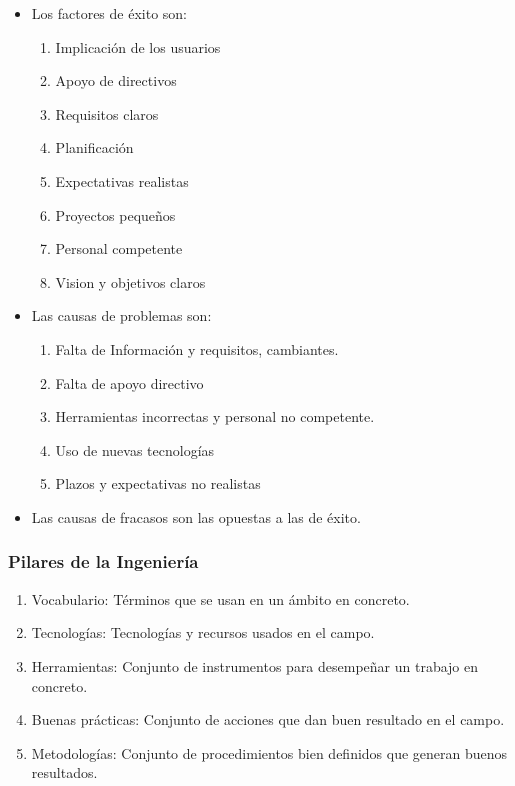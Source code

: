 \begin{itemize}
        \item \color{green}Los factores de éxito\color{black} son:
              \begin{enumerate}
                      \item Implicación de los usuarios
                      \item Apoyo de directivos
                      \item Requisitos claros
                      \item Planificación
                      \item Expectativas realistas
                      \item Proyectos pequeños
                      \item Personal competente
                      \item Vision y objetivos claros
              \end{enumerate}
        \item \color{yellow}Las causas de problemas\color{black} son:
              \begin{enumerate}
                      \item Falta de Información y requisitos, cambiantes.
                      \item Falta de apoyo directivo
                      \item Herramientas incorrectas y personal no competente.
                      \item Uso de nuevas tecnologías
                      \item Plazos y expectativas no realistas
              \end{enumerate}
        \item \color{red}Las causas de fracasos\color{black} son las opuestas a las de éxito.
\end{itemize}
\subsubsection{Pilares de la Ingeniería}
\begin{enumerate}
        \item Vocabulario: Términos que se usan en un ámbito en concreto.
        \item Tecnologías: Tecnologías y recursos usados en el campo.
        \item Herramientas: Conjunto de instrumentos para desempeñar un trabajo en concreto.
        \item Buenas prácticas: Conjunto de acciones que dan buen resultado en el campo.
        \item Metodologías: Conjunto de procedimientos bien definidos que generan buenos resultados.
\end{enumerate}
